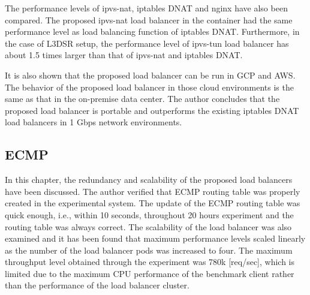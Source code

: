 The performance levels of ipvs-nat, iptables DNAT and nginx have also been compared.
The proposed ipvs-nat load balancer in the container had the same performance level as load balancing function of iptables DNAT.
Furthermore, in the case of L3DSR setup, the performance level of ipvs-tun load balancer has about 1.5 times larger than that of ipvs-nat and iptables DNAT.

It is also shown that the proposed load balancer can be run in GCP and AWS.
The behavior of the proposed load balancer in those cloud environments is the same as that in the on-premise data center.
The author concludes that the proposed load balancer is portable and outperforms the existing iptables DNAT load balancers in 1 Gbps network environments.


\subsection{ECMP}

In this chapter, the redundancy and scalability of the proposed load balancers have been discussed.
The author verified that ECMP routing table was properly created in the experimental system.
The update of the ECMP routing table was quick enough, i.e., within 10 seconds, throughout 20 hours experiment and the routing table was always correct.
The scalability of the load balancer was also examined and it has been found that maximum performance levels scaled linearly as the number of the load balancer pods was increased to four.
The maximum throughput level obtained through the experiment was 780k [req/sec], which is limited due to the maximum CPU performance of the benchmark client rather than the performance of the load balancer cluster.


